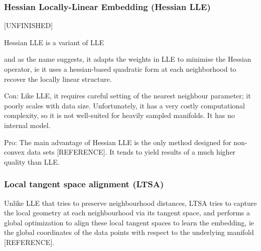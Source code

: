 \documentclass[journal, a4paper]{IEEEtran}
\begin{document}
\hfill
\subsubsection{Hessian Locally-Linear Embedding (Hessian LLE)}
[UNFINISHED]

Hessian LLE is a variant of LLE

and as the name suggests, it adapts the weights in LLE to minimise the Hessian operator, ie it uses a hessian-based quadratic form at each neighborhood to recover the locally linear structure. 

Con: Like LLE, it requires careful setting of the nearest neighbour parameter; it poorly scales with data size.
Unfortunately, it has a very costly computational complexity, so it is not well-suited for heavily sampled manifolds. It has no internal model.

Pro: The main advantage of Hessian LLE is the only method designed for non-convex data sets [REFERENCE].
It tends to yield results of a much higher quality than LLE. 



\hfill
\subsubsection{Local tangent space alignment (LTSA)}

Unlike LLE that tries to preserve neighbourhood distances, LTSA tries to capture the local geometry at each neighbourhood via its tangent space, and performs a global optimization to align these local tangent spaces to learn the embedding, ie the global coordinates of the data points with respect to the underlying manifold [REFERENCE].
\end{document}
